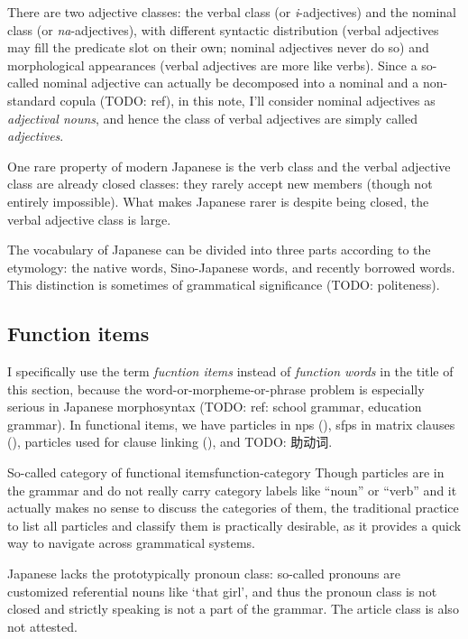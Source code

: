 \documentclass[UTF8, a4paper, oneside, scheme=plain]{ctexrep}
\newcommand*{\term}[1]{\emph{#1}}
\newcommand{\corpus}[1]{\emph{#1}}
\newcommand{\translate}[1]{`#1'}
\begin{document}
There are two adjective classes:
the verbal class (or \corpus{i}-adjectives)
and the nominal class (or \corpus{na}-adjectives),
with different syntactic distribution 
(verbal adjectives may fill the predicate slot on their own; nominal adjectives never do so)
and morphological appearances
(verbal adjectives are more like verbs).
Since a so-called nominal adjective 
can actually be decomposed into a nominal and a non-standard copula (TODO: ref),
in this note, I'll consider nominal adjectives as \emph{adjectival nouns},
and hence the class of verbal adjectives are simply called \emph{adjectives}.

One rare property of modern Japanese is the verb class and the verbal adjective class 
are already closed classes:
they rarely accept new members (though not entirely impossible).
What makes Japanese rarer is despite being closed,
the verbal adjective class is large.

The vocabulary of Japanese can be divided into three parts according to the etymology:
the native words,
Sino-Japanese words,
and recently borrowed words.
This distinction is sometimes of grammatical significance (TODO: politeness).

\subsection{Function items}

I specifically use the term \term{fucntion items} instead of \term{function words}
in the title of this section,
because the word-or-morpheme-or-phrase problem is especially serious in Japanese morphosyntax
(TODO: ref: school grammar, education grammar).
In functional items,
we have particles in \acs{np}s (),
\acs{sfp}s in matrix clauses (),
particles used for clause linking (),
and TODO: 助动词.

\begin{theorybox}{So-called category of functional items}{function-category}
    Though particles are in the grammar and do not really carry category labels like ``noun'' or ``verb''
    and it actually makes no sense to discuss the categories of them,
    the traditional practice to list all particles and classify them 
    is practically desirable, 
    as it provides a quick way to navigate across grammatical systems.
\end{theorybox}

Japanese lacks the prototypically pronoun class:
so-called pronouns are customized referential nouns like \translate{that girl},
and thus the pronoun class is not closed and strictly speaking is not a part of the grammar.
The article class is also not attested.
\end{document}
